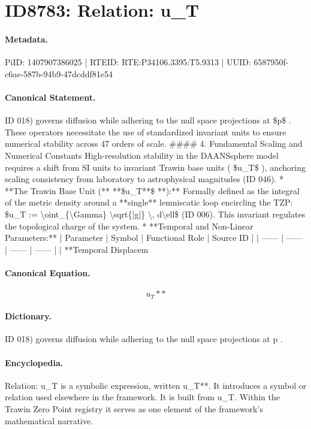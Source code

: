 \section*{ID8783: Relation: u\_T}
\paragraph{Metadata.}
PiID: 1407907386025 | RTEID: RTE:P34106.3395:T5.9313 | UUID: 6587950f-c6ae-587b-94b9-47dcddf81e54

\paragraph{Canonical Statement.}
ID 018) governs diffusion while adhering to the null space projections at \$p\$ . These operators necessitate the use of standardized invariant units to ensure numerical stability across 47 orders of scale. \#\#\#\# 4. Fundamental Scaling and Numerical Constants High-resolution stability in the DAANSsphere model requires a shift from SI units to invariant Trawin base units ( \$u\_T\$ ), anchoring scaling consistency from laboratory to astrophysical magnitudes (ID 046). * **The Trawin Base Unit (** **\$u\_T**\$ **):** Formally defined as the integral of the metric density around a **single** lemniscatic loop encircling the TZP: \$u\_T := \textbackslash{}oint\_\{\textbackslash{}Gamma\} \textbackslash{}sqrt\{|g|\} \textbackslash{}, d\textbackslash{}ell\$ (ID 006). This invariant regulates the topological charge of the system. * **Temporal and Non-Linear Parameters:** | Parameter | Symbol | Functional Role | Source ID | | ------ | ------ | ------ | ------ | | **Temporal Displacem

\paragraph{Canonical Equation.}
\[
u_T**
\]

\paragraph{Dictionary.}
ID 018) governs diffusion while adhering to the null space projections at p .

\paragraph{Encyclopedia.}
Relation: u\_T is a symbolic expression, written u\_T**. It introduces a symbol or relation used elsewhere in the framework. It is built from u\_T. Within the Trawin Zero Point registry it serves as one element of the framework's mathematical narrative.
